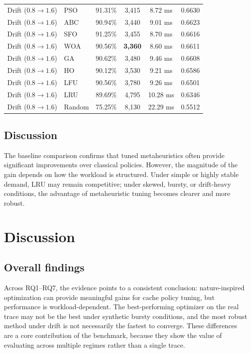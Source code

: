 \documentclass[10pt,journal,compsoc]{IEEEtran}
\begin{document}
\begin{table}[htbp]
\begin{tabular}{llcccc}
Drift ($0.8\to1.6$) & PSO    & 91.31\% & 3,415 & 8.72 ms & 0.6630 \\
Drift ($0.8\to1.6$) & ABC    & 90.94\% & 3,440 & 9.01 ms & 0.6623 \\
Drift ($0.8\to1.6$) & SFO    & 91.25\% & 3,455 & 8.70 ms & 0.6616 \\
Drift ($0.8\to1.6$) & WOA    & 90.56\% & \textbf{3,360} & 8.60 ms & 0.6611 \\
Drift ($0.8\to1.6$) & GA     & 90.62\% & 3,480 & 9.46 ms & 0.6608 \\
Drift ($0.8\to1.6$) & HO     & 90.12\% & 3,530 & 9.21 ms & 0.6586 \\
Drift ($0.8\to1.6$) & LFU    & 90.56\% & 3,780 & 9.26 ms & 0.6501 \\
Drift ($0.8\to1.6$) & LRU    & 89.69\% & 4,795 & 10.28 ms & 0.6346 \\
Drift ($0.8\to1.6$) & Random & 75.25\% & 8,130 & 22.29 ms & 0.5512 \\
\bottomrule
\end{tabular}
\end{table}

\subsection{Discussion}
The baseline comparison confirms that tuned metaheuristics often provide significant improvements over classical policies. However, the magnitude of the gain depends on how the workload is structured. Under simple or highly stable demand, LRU may remain competitive; under skewed, bursty, or drift-heavy conditions, the advantage of metaheuristic tuning becomes clearer and more robust.

\section{Discussion}
\subsection{Overall findings}
Across RQ1--RQ7, the evidence points to a consistent conclusion: nature-inspired optimization can provide meaningful gains for cache policy tuning, but performance is workload-dependent. The best-performing optimizer on the real trace may not be the best under synthetic bursty conditions, and the most robust method under drift is not necessarily the fastest to converge. These differences are a core contribution of the benchmark, because they show the value of evaluating across multiple regimes rather than a single trace.
\end{document}
